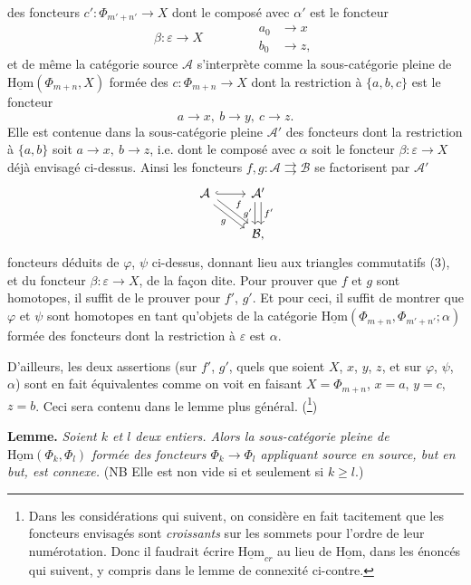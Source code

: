 \documentclass[11pt]{article}
\newcommand{\printedpage}[1]{\marginpar{\footnotesize p.~#1}}
\newcommand{\msp}[1]{\marginpar{\footnotesize [#1]}}
\newcommand{\uHom}{\underline{\mathrm{Hom}}}
\begin{document}
\msp{page 16}
des foncteurs $c':\Phi_{m'+n'}\longrightarrow X$ dont le composé avec $\alpha'$ est le foncteur
\[
\beta:\varepsilon\longrightarrow X\qquad\qquad
\begin{aligned}
a_0&\longrightarrow x\\
b_0&\longrightarrow z,
\end{aligned} \tag*{$(*)$}
\]
et de même la catégorie source $\mathcal{A}$ s'interprète comme la sous-catégorie pleine de $\uHom(\Phi_{m+n},X)$ formée des $c:\Phi_{m+n}\longrightarrow X$ dont la restriction à $\{a,b,c\}$ est le foncteur
\[
a\longrightarrow x,\ b\longrightarrow y,\ c\longrightarrow z.
\]
 Elle est contenue dans la sous-catégorie pleine $\mathcal{A}'$ des foncteurs dont la restriction à $\{a,b\}$ soit $a\longrightarrow x,\ b\longrightarrow z$, i.e. dont le composé avec $\alpha$ soit le foncteur $\beta:\varepsilon\longrightarrow X$ déjà envisagé ci-dessus. Ainsi les foncteurs $f,g:\mathcal{A}\rightrightarrows\mathcal{B}$ se factorisent par $\mathcal{A}'$
\printedpage{11}
\[
\begin{tikzcd}
\mathcal{A} \arrow[r,hook] \arrow[dr,shift left,"f"] \arrow[dr,shift right,"g"'] & \mathcal{A}' \arrow[d,shift right,"g'"'] \arrow[d,shift left,"f'"] \\
 & \mathcal{B},
\end{tikzcd}
\]
foncteurs déduits de $\varphi$, $\psi$ ci-dessus, donnant lieu aux triangles commutatifs (3), et du foncteur $\beta:\varepsilon\longrightarrow X$, de la façon dite. Pour prouver que $f$ et $g$ sont homotopes, il suffit de le prouver pour $f'$, $g'$. Et pour ceci, il suffit de montrer que $\varphi$ et $\psi$ sont homotopes en tant qu'objets de la catégorie $\uHom(\Phi_{m+n},\Phi_{m'+n'};\alpha)$ formée des foncteurs dont la restriction à $\varepsilon$ est $\alpha$.

\msp{page 17}
D'ailleurs, les deux assertions (sur $f'$, $g'$, quels que soient $X$, $x$, $y$, $z$, et sur $\varphi$, $\psi$, $\alpha$) sont en fait équivalentes comme on voit en faisant $X=\Phi_{m+n}$, $x=a$, $y=c$, $z=b$. Ceci sera contenu dans le lemme plus général. (\footnote[4]{Dans les considérations qui suivent, on considère en fait tacitement que les foncteurs envisagés sont \textit{croissants} sur les sommets pour l'ordre de leur numérotation. Donc il faudrait écrire $\uHom_{cr}$ au lieu de $\uHom$, dans les énoncés qui suivent, y compris dans le lemme de connexité ci-contre.})

\textbf{Lemme.} \textit{Soient $k$ et $l$ deux entiers. Alors la sous-catégorie pleine de $\uHom(\Phi_k,\Phi_l)$ formée des foncteurs $\Phi_k\longrightarrow\Phi_l$ appliquant source en source, but en but, est connexe.} (NB Elle est non vide si et seulement si $k\geq l$.)
\end{document}
